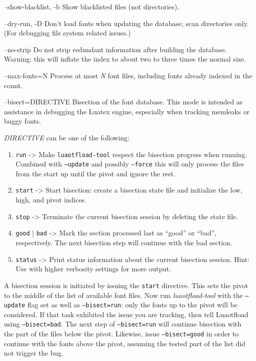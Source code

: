 \documentclass[a4paper]{article}
\providecommand*{\DUoptionlistlabel}[1]{\bf #1 \hfill}
\newenvironment{DUoptionlist}{%
    \list{}{\setlength{\labelwidth}{\DUoptionlistindent}
            \setlength{\rightmargin}{1cm}
            \setlength{\leftmargin}{\rightmargin}
            \addtolength{\leftmargin}{\labelwidth}
            \addtolength{\leftmargin}{\labelsep}
            \renewcommand{\makelabel}{\DUoptionlistlabel}}
  }
  {\endlist}
\begin{document}
\begin{DUoptionlist}
\item[--show-blacklist, -b]  Show blacklisted files (not directories).

\item[--dry-run, -D]  Don’t load fonts when updating the database;
scan directories only.
(For debugging file system related issues.)

\item[--no-strip]  Do not strip redundant information after
building the database. Warning: this will
inflate the index to about two to three times
the normal size.

\item[--max-fonts=N]  Process at most \emph{N} font files, including fonts
already indexed in the count.

\item[--bisect=DIRECTIVE]  Bisection of the font database.
This mode is intended as assistance in
debugging the Luatex engine, especially when
tracking memleaks or buggy fonts.

\emph{DIRECTIVE} can be one of the following:

\begin{enumerate}
\renewcommand{\labelenumi}{\arabic{enumi})}
\item \texttt{run} -> Make \texttt{luaotfload-tool} respect
the bisection progress when running.
Combined with \texttt{--update} and possibly
\texttt{--force} this will only process the files
from the start up until the pivot and ignore
the rest.

\item \texttt{start} -> Start bisection: create a
bisection state file and initialize the low,
high, and pivot indices.

\item \texttt{stop} -> Terminate the current bisection
session by deleting the state file.

\item \texttt{good} | \texttt{bad} -> Mark the section
processed last as “good” or “bad”,
respectively. The next bisection step will
continue with the bad section.

\item \texttt{status} -> Print status information about
the current bisection session. Hint: Use
with higher verbosity settings for more
output.
\end{enumerate}

A bisection session is initiated by issuing the
\texttt{start} directive. This sets the pivot to the
middle of the list of available font files.
Now run \emph{luaotfload-tool} with the \texttt{--update}
flag set as well as \texttt{--bisect=run}: only the
fonts up to the pivot will be considered. If
that task exhibited the issue you are tracking,
then tell Luaotfload using \texttt{--bisect=bad}.
The next step of \texttt{--bisect=run} will continue
bisection with the part of the files below the
pivot.
Likewise, issue \texttt{--bisect=good} in order to
continue with the fonts above the pivot,
assuming the tested part of the list did not
trigger the bug.


\end{DUoptionlist}
\end{document}
